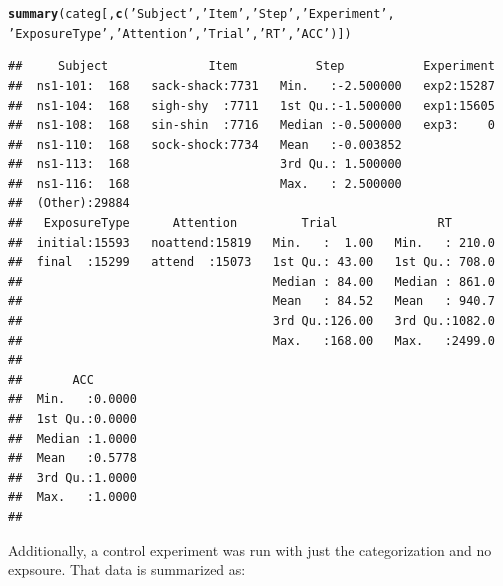 \documentclass[11pt]{article}\usepackage[]{graphicx}\usepackage[]{color}
\makeatletter
\newcommand{\hlstr}[1]{\textcolor[rgb]{0.192,0.494,0.8}{#1}}%
\newcommand{\hlstd}[1]{\textcolor[rgb]{0.345,0.345,0.345}{#1}}%
\newcommand{\hlkwd}[1]{\textcolor[rgb]{0.737,0.353,0.396}{\textbf{#1}}}%
\newenvironment{kframe}{%
 \def\at@end@of@kframe{}%
 \ifinner\ifhmode%
  \def\at@end@of@kframe{\end{minipage}}%
  \begin{minipage}{\columnwidth}%
 \fi\fi%
 \def\FrameCommand##1{\hskip\@totalleftmargin \hskip-\fboxsep
 \colorbox{shadecolor}{##1}\hskip-\fboxsep
     \hskip-\linewidth \hskip-\@totalleftmargin \hskip\columnwidth}%
 \MakeFramed {\advance\hsize-\width
   \@totalleftmargin\z@ \linewidth\hsize
   \@setminipage}}%
 {\par\unskip\endMakeFramed%
 \at@end@of@kframe}
\newenvironment{knitrout}{}{} %
\makeatother
\begin{document}
\begin{knitrout}\footnotesize
{}\color{fgcolor}\begin{kframe}
\begin{alltt}
 \hlkwd{summary}\hlstd{(categ[,}\hlkwd{c}\hlstd{(}\hlstr{'Subject'}\hlstd{,} \hlstr{'Item'}\hlstd{,} \hlstr{'Step'}\hlstd{,} \hlstr{'Experiment'}\hlstd{,}
 \hlstr{'ExposureType'}\hlstd{,} \hlstr{'Attention'}\hlstd{,} \hlstr{'Trial'}\hlstd{,} \hlstr{'RT'}\hlstd{,} \hlstr{'ACC'}\hlstd{)])}
\end{alltt}
\begin{verbatim}
##     Subject              Item           Step           Experiment  
##  ns1-101:  168   sack-shack:7731   Min.   :-2.500000   exp2:15287  
##  ns1-104:  168   sigh-shy  :7711   1st Qu.:-1.500000   exp1:15605  
##  ns1-108:  168   sin-shin  :7716   Median :-0.500000   exp3:    0  
##  ns1-110:  168   sock-shock:7734   Mean   :-0.003852               
##  ns1-113:  168                     3rd Qu.: 1.500000               
##  ns1-116:  168                     Max.   : 2.500000               
##  (Other):29884                                                     
##   ExposureType      Attention         Trial              RT        
##  initial:15593   noattend:15819   Min.   :  1.00   Min.   : 210.0  
##  final  :15299   attend  :15073   1st Qu.: 43.00   1st Qu.: 708.0  
##                                   Median : 84.00   Median : 861.0  
##                                   Mean   : 84.52   Mean   : 940.7  
##                                   3rd Qu.:126.00   3rd Qu.:1082.0  
##                                   Max.   :168.00   Max.   :2499.0  
##                                                                    
##       ACC        
##  Min.   :0.0000  
##  1st Qu.:0.0000  
##  Median :1.0000  
##  Mean   :0.5778  
##  3rd Qu.:1.0000  
##  Max.   :1.0000  
## 
\end{verbatim}
\end{kframe}
\end{knitrout}

Additionally, a control experiment was run with just the categorization and no expsoure.  That data is summarized as:
\end{document}
